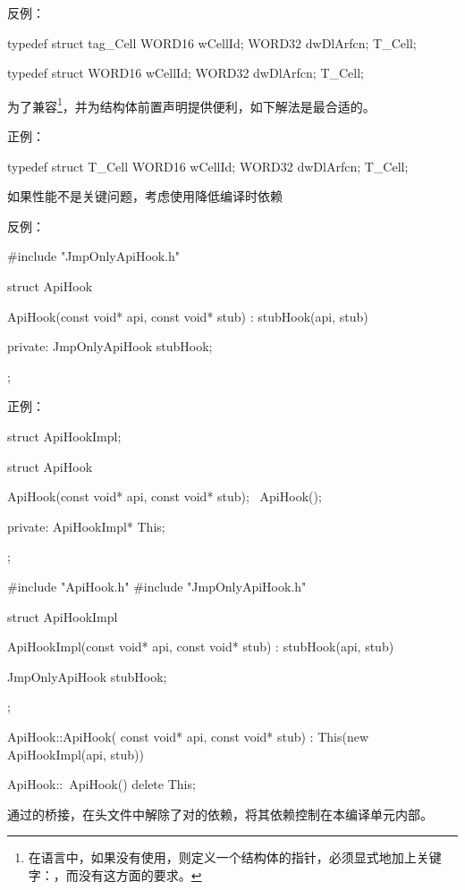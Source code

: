 \begin{content}
反例：
\begin{leftbar}
\begin{c++}
typedef struct tag_Cell
{
    WORD16 wCellId;
    WORD32 dwDlArfcn;
} T_Cell;

typedef struct
{
    WORD16 wCellId;
    WORD32 dwDlArfcn;
} T_Cell;
\end{c++}
\end{leftbar}

为了兼容\clang{}\footnote{在\clang{}语言中，如果没有使用，则定义一个结构体的指针，必须显式地加上关键字：，而\cpp{}没有这方面的要求。}，并为结构体前置声明提供便利，如下解法是最合适的。

正例：
\begin{leftbar}
\begin{c++}
typedef struct T_Cell
{
    WORD16 wCellId;
    WORD32 dwDlArfcn;
} T_Cell;
\end{c++}
\end{leftbar}

\begin{advise}
如果性能不是关键问题，考虑使用降低编译时依赖
\end{advise}

反例：
\begin{leftbar}
\begin{c++}
#include "JmpOnlyApiHook.h"

struct ApiHook
{
    ApiHook(const void* api, const void* stub)
      : stubHook(api, stub)
    {}

private:
    JmpOnlyApiHook stubHook;
};
\end{c++}
\end{leftbar}

正例：
\begin{leftbar}
\begin{c++}
struct ApiHookImpl;

struct ApiHook
{
    ApiHook(const void* api, const void* stub);
    ~ApiHook();

private:
    ApiHookImpl* This;
};
\end{c++}
\end{leftbar}

\begin{leftbar}
\begin{c++}
#include "ApiHook.h"
#include "JmpOnlyApiHook.h"

struct ApiHookImpl
{
   ApiHookImpl(const void* api, const void* stub)
     : stubHook(api, stub)
   {
   }

   JmpOnlyApiHook stubHook;
};

ApiHook::ApiHook( const void* api, const void* stub)
  : This(new ApiHookImpl(api, stub))
{
}

ApiHook::~ApiHook()
{
    delete This;
}
\end{c++}
\end{leftbar}

通过的桥接，在头文件中解除了对的依赖，将其依赖控制在本编译单元内部。

\end{content}

